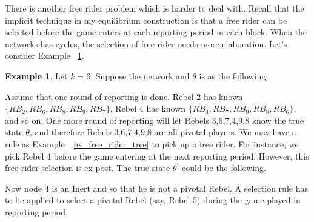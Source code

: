 \documentclass[12pt,letterpaper]{article}
\theoremstyle{definition}
\newtheorem{example}{Example}[section]
\theoremstyle{remark}
\theoremstyle{claim}
\begin{document}
There is another free rider problem which is harder to deal with. Recall that the implicit technique in my equilibrium construction is that a free rider can be selected before the game enters at each reporting period in each block. When the networks has cycles, the selection of free rider needs more elaboration. Let's consider Example ~\ref{ex_free_rider_cycle}.
\begin{example}\label{ex_free_rider_cycle}
Let $k=6$. Suppose the network and $\theta$ is as the following. 

\begin{center}
\end{center}

Assume that one round of reporting is done. Rebel 2 has known $\{RB_2,RB_6,RB_8,RB_9,RB_7\}$, Rebel 4 has known $\{RB_4,RB_7,RB_9,RB_8,RB_6\}$, and so on. One more round of reporting will let Rebels 3,6,7,4,9,8 know the true state $\theta$, and therefore Rebels 3,6,7,4,9,8 are all pivotal players. We may have a rule as Example ~\ref{ex_free_rider_tree} to pick up a free rider. For instance, we pick Rebel 4 before the game entering at the next reporting period. However, this free-rider selection is ex-post. The true state $\theta^{'}$ could be the following.

\begin{center}
\end{center}

Now node 4 is an Inert and so that he is not a pivotal Rebel. A selection rule has to be applied to select a pivotal Rebel (say, Rebel 5) during the game played in reporting period. 

\end{example}
\end{document}
